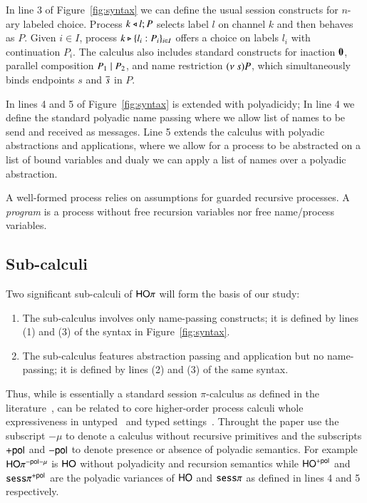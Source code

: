 In line 3 of Figure~\ref{fig:syntax} we can define the usual session
constructs for $n$-ary labeled choice.
Process $k \triangleleft l ; P$ selects label $l$ on channel $k$ and then behaves as $P$. 
Given $i \in I$, 
process $k \triangleright \{l_i:P_i\}_{i \in I}$ offers a choice on labels $l_i$ with
continuation $P_i$.
The calculus also includes standard constructs for 
inaction $\mathbf{0}$, 
parallel composition $P_1 \;|\; P_2$, and 
name restriction $(\nu\ s) P$, which simultaneously binds endpoints $s$ and $\overline{s}$ in $P$.

In lines 4 and 5 of Figure~\ref{fig:syntax} \HOp is extended with polyadicidy;
In line 4 we define the standard polyadic name passing where we allow 
list of names to be send and received as messages. 
Line 5 extends the calculus with polyadic abstractions and applications,
where we allow for a process to be abstracted on a list of
bound variables and dualy we can apply a list of names
over a polyadic abstraction.

A well-formed process relies on assumptions for guarded recursive processes.
A \emph{program} is a process without free 
recursion variables nor free name/process variables.



\subsection{Sub-calculi}

Two significant sub-calculi of $\mathsf{HO}\pi$ will form the basis of our study:
%
\begin{enumerate}[-]
	\item	The sub-calculus \sessp involves only name-passing constructs; it is 
		defined by lines (1) and (3) of the syntax in Figure~\ref{fig:syntax}.

	\item	The sub-calculus \HO features abstraction passing and application but no name-passing; 
		it is defined by lines (2) and (3) of the same syntax.
\end{enumerate}
%
Thus, while \sessp is essentially a standard session $\pi$-calculus as defined in the
literature~\cite{honda.vasconcelos.kubo:language-primitives,GH05},
\HO can be related to core higher-order process calculi whole expressiveness
in untyped~\cite{} and typed settings~\cite{}.%
Throught the paper use the subscript $-\mu$ to denote a calculus without recursive
primitives and the subscripts $+\mathsf{pol}$ and $-\mathsf{pol}$ to denote presence or
absence of polyadic semantics. For example $\mathsf{HO}\pi^{-\mathsf{pol}-\mu}$ is $\mathsf{HO}$ without
polyadicity and recursion semantics while $\mathsf{HO}^{+\mathsf{pol}}$ and $\mathtt{sess}\pi^{+\mathsf{pol}}$
are the polyadic variances of $\mathsf{HO}$ and $\mathtt{sess}\pi$ as defined in lines 4 and 5 respectively.

